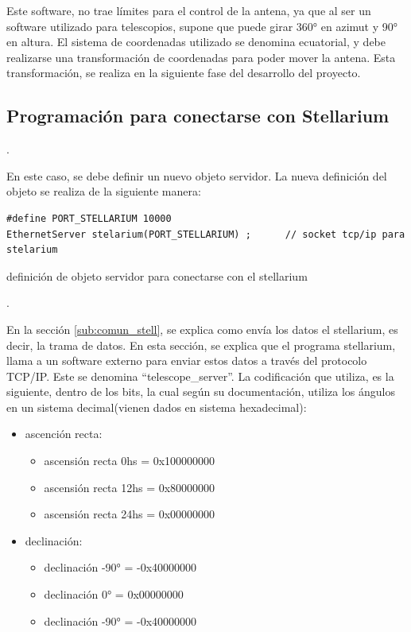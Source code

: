 Este software, no trae límites para el control de la antena, ya que al ser un software utilizado para telescopios, supone que puede girar 360° en azimut y 90° en altura. El sistema de coordenadas utilizado se denomina ecuatorial, y debe realizarse una transformación de coordenadas para poder mover la antena. Esta transformación, se realiza en la siguiente fase del desarrollo del proyecto. 



\subsection{Programación para conectarse con Stellarium}. 

En este caso, se debe definir un nuevo objeto servidor. La nueva definición del objeto se realiza de la siguiente manera: 

\begin{listing}[ht]
	\begin{verbatim}
#define PORT_STELLARIUM 10000
EthernetServer stelarium(PORT_STELLARIUM) ;      // socket tcp/ip para stelarium 
	\end{verbatim}
\caption{definición de objeto servidor para conectarse con el stellarium}. 
\end{listing}

En la sección \ref{sub:comun_stell}, se explica como envía los datos el stellarium, es decir, la trama de datos. En esta sección, se explica que el programa stellarium, llama a un software externo para enviar estos datos a través del protocolo TCP/IP. Este se denomina ``telescope\_server''. La codificación que utiliza, es la siguiente, dentro de los bits, la cual según su documentación, utiliza los ángulos en un sistema decimal(vienen dados en sistema hexadecimal): 

\begin{itemize}
	\item ascención recta: 
		\begin{itemize}
		 \item	ascensión recta 0hs  = 0x100000000   		
		 \item	ascensión recta 12hs = 0x80000000 
		 \item	ascensión recta 24hs = 0x00000000
	\end{itemize}
	\item declinación: 
		\begin{itemize}
		  \item	declinación -90° = -0x40000000
		  \item	declinación  0°  =  0x00000000
		  \item	declinación -90° = -0x40000000
		\end{itemize}
\end{itemize}

